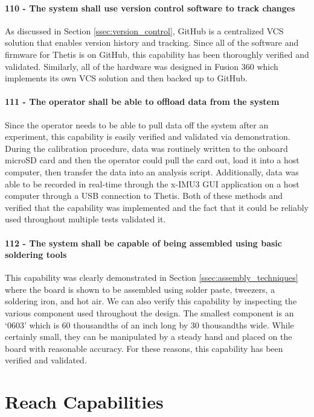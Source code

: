 \paragraph*{110 - The system shall use version control software to track changes} As discussed in Section \ref{ssec:version_control}, GitHub is a centralized VCS solution that enables version history and tracking.
Since all of the software and firmware for Thetis is on GitHub, this capability has been thoroughly verified and validated.
Similarly, all of the hardware was designed in Fusion 360 which implements its own VCS solution and then backed up to GitHub.

\paragraph*{111 - The operator shall be able to offload data from the system} Since the operator needs to be able to pull data off the system after an experiment, this capability is easily verified and validated via demonstration.
During the calibration procedure, data was routinely written to the onboard microSD card and then the operator could pull the card out, load it into a host computer, then transfer the data into an analysis script.
Additionally, data was able to be recorded in real-time through the x-IMU3 GUI application on a host computer through a USB connection to Thetis.
Both of these methods and verified that the capability was implemented and the fact that it could be reliably used throughout multiple tests validated it.

\paragraph*{112 - The system shall be capable of being assembled using basic soldering tools} This capability was clearly demonstrated in Section \ref{ssec:assembly_techniques} where the board is shown to be assembled using solder paste, tweezers, a soldering iron, and hot air.
We can also verify this capability by inspecting the various component used throughout the design.
The smallest component is an `0603' which is 60 thousandths of an inch long by 30 thousandths wide.
While certainly small, they can be manipulated by a steady hand and placed on the board with reasonable accuracy.
For these reasons, this capability has been verified and validated.

\section{Reach Capabilities}

